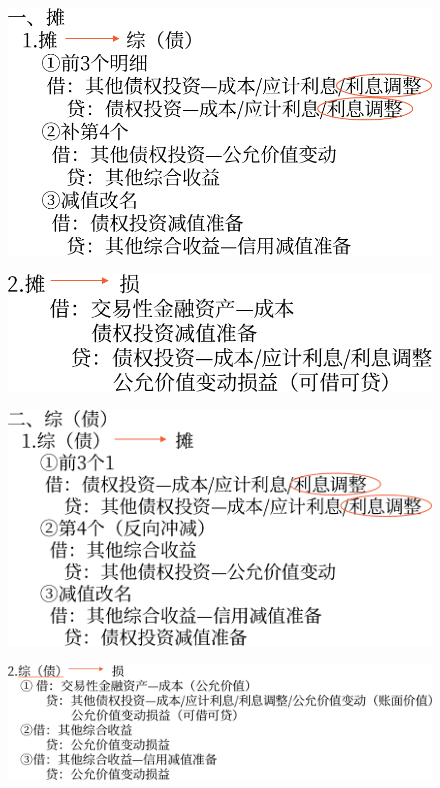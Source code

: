 \documentclass[UTF8,12pt]{ctexart}
\numberwithin{equation}{section} %
\numberwithin{figure}{section}
\numberwithin{table}{section}
\begin{document}
	\begin{figure}[h!]
		\centering
		\includegraphics[width=0.7\linewidth]{pic/金融资产重分类1}
		\caption{}
	\end{figure}

	\begin{figure}[h!]
		\centering
		\includegraphics[width=0.7\linewidth]{pic/金融资产重分类2}
		\caption{}
	\end{figure}
	
	\begin{figure}[h!]
		\centering
		\includegraphics[width=0.7\linewidth]{pic/金融资产重分类3}
		\caption{}
	\end{figure}
	
	\begin{figure}[h!]
		\centering
		\includegraphics[width=0.7\linewidth]{pic/金融资产重分类4}
		\caption{}
	\end{figure}
	
\end{document}
